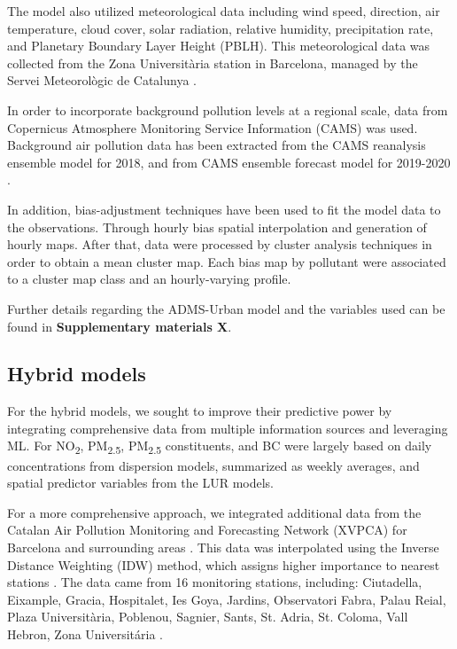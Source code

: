 \documentclass{article}
\begin{document}
The model also utilized meteorological data including wind speed, direction, air temperature, cloud cover, solar radiation, relative humidity, precipitation rate, and Planetary Boundary Layer Height (PBLH). This meteorological data was collected from the Zona Universitària station in Barcelona, managed by the Servei Meteorològic de Catalunya \cite{xema2013}.

In order to incorporate background pollution levels at a regional scale, data from Copernicus Atmosphere Monitoring Service Information (CAMS) was used. Background air pollution data has been extracted from the CAMS reanalysis ensemble model for 2018, and from CAMS ensemble forecast model for 2019-2020 \cite{cams2020, franceinstitut}. 

In addition, bias-adjustment techniques have been used to fit the model data to the observations. Through hourly bias spatial interpolation and generation of hourly maps. After that, data were processed  by cluster analysis techniques in order to obtain a mean cluster map. Each bias map by pollutant were associated to a cluster map class and an hourly-varying profile. 

Further details regarding the ADMS-Urban model and the variables used can be found in \textbf{Supplementary materials X}.

\subsection{Hybrid models}

For the hybrid models, we sought to improve their predictive power by integrating comprehensive data from multiple information sources and leveraging ML. For NO\textsubscript{2}, PM\textsubscript{2.5}, PM\textsubscript{2.5} constituents, and BC were largely based on daily concentrations from dispersion models, summarized as weekly averages, and spatial predictor variables from the LUR models. 

For a more comprehensive approach, we integrated additional data from the Catalan Air Pollution Monitoring and Forecasting Network (XVPCA) for Barcelona and surrounding areas \cite{xarxa2012}. This data was interpolated using the Inverse Distance Weighting (IDW) method, which assigns higher importance to nearest stations \cite{hoek2017methods}. The data came from 16 monitoring stations, including: Ciutadella, Eixample, Gracia, Hospitalet, Ies Goya, Jardins, Observatori Fabra, Palau Reial, Plaza Universitària, Poblenou, Sagnier, Sants, St. Adria, St. Coloma, Vall Hebron, Zona Universitária \cite{xarxa2012}.
\end{document}
